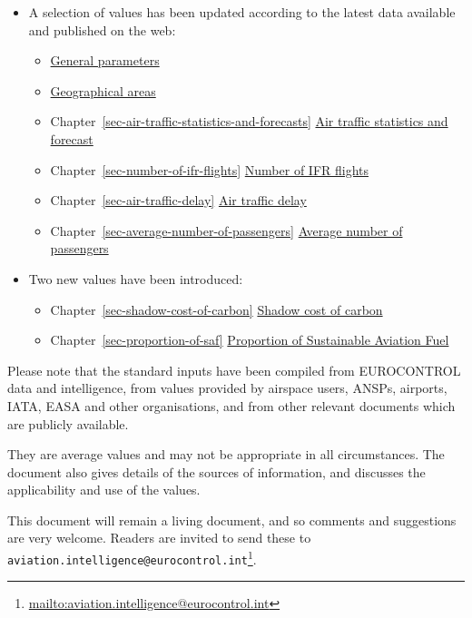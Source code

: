 \documentclass[
  11pt,
  a4paper,
]{book}
\providecommand{\tightlist}{%
  \setlength{\itemsep}{0pt}\setlength{\parskip}{0pt}}\usepackage{longtable,booktabs,array}
\DeclareRobustCommand{\href}[2]{#2\footnote{\url{#1}}}
\begin{document}
\begin{itemize}
\tightlist
\item
  A selection of values has been updated according to the latest data
  available and published on the web:

  \begin{itemize}
  \tightlist
  \item
    \protect\hyperlink{sec-conversions}{General parameters}
  \item
    \protect\hyperlink{sec-geographical-areas}{Geographical areas}
  \item
    Chapter~\ref{sec-air-traffic-statistics-and-forecasts}
    \protect\hyperlink{sec-air-traffic-statistics-and-forecasts}{Air
    traffic statistics and forecast}
  \item
    Chapter~\ref{sec-number-of-ifr-flights}
    \protect\hyperlink{sec-number-of-ifr-flights}{Number of IFR flights}
  \item
    Chapter~\ref{sec-air-traffic-delay}
    \protect\hyperlink{sec-air-traffic-delay}{Air traffic delay}
  \item
    Chapter~\ref{sec-average-number-of-passengers}
    \protect\hyperlink{sec-average-number-of-passengers}{Average number
    of passengers}
  \end{itemize}
\item
  Two new values have been introduced:

  \begin{itemize}
  \tightlist
  \item
    Chapter~\ref{sec-shadow-cost-of-carbon}
    \protect\hyperlink{sec-shadow-cost-of-carbon}{Shadow cost of carbon}
  \item
    Chapter~\ref{sec-proportion-of-saf}
    \protect\hyperlink{sec-proportion-of-saf}{Proportion of Sustainable
    Aviation Fuel}
  \end{itemize}
\end{itemize}

Please note that the standard inputs have been compiled from EUROCONTROL
data and intelligence, from values provided by airspace users, ANSPs,
airports, IATA, EASA and other organisations, and from other relevant
documents which are publicly available.

They are average values and may not be appropriate in all circumstances.
The document also gives details of the sources of information, and
discusses the applicability and use of the values.

This document will remain a living document, and so comments and
suggestions are very welcome. Readers are invited to send these to
\href{mailto:aviation.intelligence@eurocontrol.int}{\nolinkurl{aviation.intelligence@eurocontrol.int}}.
\end{document}
